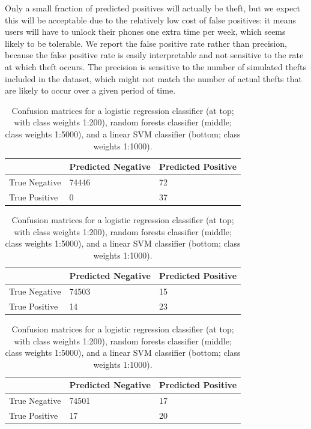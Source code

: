 Only a small fraction of predicted positives will actually be theft, but we expect this will be acceptable due to the relatively low cost of false positives: it means users will have to unlock their phones one extra time per week, which seems likely to be tolerable. We report the false positive rate rather than precision, because the false positive rate is easily interpretable and not sensitive to the rate at which theft occurs. The precision is sensitive to the number of simulated thefts included in the dataset, which might not match the number of actual thefts that are likely to occur over a given period of time.


\begin{table}[t]
\centering
\begin{tabular}{@{}lll@{}}
\toprule
              & Predicted Negative & Predicted Positive \\ \midrule
True Negative & 74446              & 72                 \\
True Positive & 0                  & 37                 \\ \bottomrule
\end{tabular}

\begin{tabular}{@{}lll@{}}
\toprule
              & Predicted Negative & Predicted Positive \\ \midrule
True Negative & 74503              & 15                 \\
True Positive & 14                 & 23                 \\ \bottomrule
\end{tabular}

\begin{tabular}{@{}lll@{}}
\toprule
              & Predicted Negative & Predicted Positive \\ \midrule
True Negative & 74501              & 17               \\
True Positive & 17                 & 20                 \\ \bottomrule
\end{tabular}
\caption{Confusion matrices for a logistic regression classifier (at top; with class weights 1:200), random forests classifier (middle; class weights 1:5000), and a linear SVM classifier (bottom; class weights 1:1000).}
\label{fig:cmat}
\end{table}


